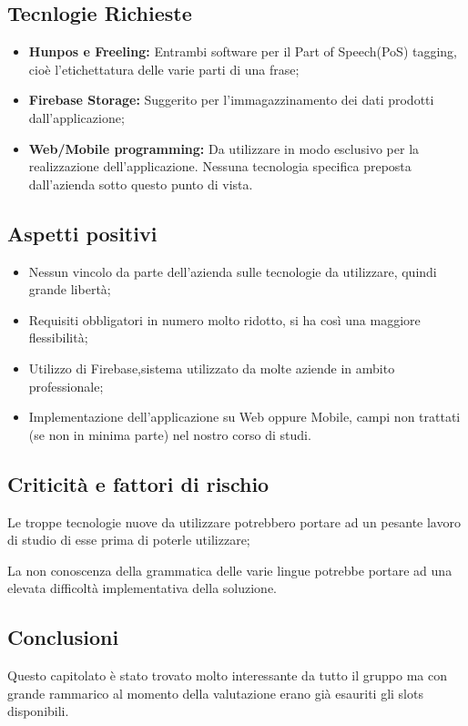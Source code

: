 \documentclass[a4paper, 11pt]{article}
\begin{document}
\subsection{Tecnlogie Richieste}
\begin{itemize}
\item \textbf{Hunpos e Freeling: } Entrambi software per il Part of Speech(PoS) tagging, cioè l'etichettatura delle varie parti di una frase;
\item \textbf{Firebase Storage: }Suggerito per l'immagazzinamento dei dati prodotti dall'applicazione;
\item \textbf{Web/Mobile programming: }Da utilizzare in modo esclusivo per la realizzazione dell'applicazione. Nessuna tecnologia specifica preposta dall'azienda sotto questo punto di vista.
\end{itemize}
\subsection{Aspetti positivi}
\begin{itemize}
\item Nessun vincolo da parte dell'azienda sulle tecnologie da utilizzare, quindi grande libertà;
\item Requisiti obbligatori in numero molto ridotto, si ha così una maggiore flessibilità;
\item Utilizzo di Firebase,sistema utilizzato da molte aziende in ambito professionale;
\item Implementazione dell'applicazione su Web oppure Mobile, campi non trattati (se non in minima parte) nel nostro corso di studi. 
\end{itemize}
\subsection{Criticità e fattori di rischio}
\item Le troppe tecnologie nuove da utilizzare potrebbero portare ad un pesante lavoro di studio di esse prima di poterle utilizzare;
\item La non conoscenza della grammatica delle varie lingue potrebbe portare ad una elevata difficoltà implementativa della soluzione.
\subsection{Conclusioni}
Questo capitolato è stato trovato molto interessante da tutto il gruppo ma con grande rammarico al momento della valutazione erano già esauriti gli slots disponibili.
\end{document}
